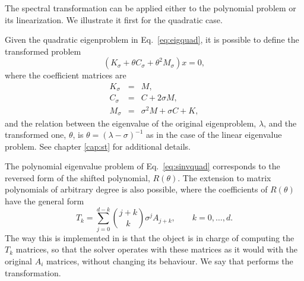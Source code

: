 The spectral transformation can be applied either to the polynomial problem or its linearization. We illustrate it first for the quadratic case.

Given the quadratic eigenproblem in Eq.\ \ref{eq:eigquad}, it is possible to define the transformed problem
\begin{equation}
\label{eq:sinvquad}
(K_\sigma+\theta C_\sigma+\theta^2M_\sigma)x=0,
\end{equation}
where the coefficient matrices are
\begin{eqnarray}
K_\sigma&\!\!=\!\!&M,\\
C_\sigma&\!\!=\!\!&C+2\sigma M,\\
M_\sigma&\!\!=\!\!&\sigma^2 M+\sigma C+K,
\end{eqnarray}
and the relation between the eigenvalue of the original eigenproblem, $\lambda$, and the transformed one, $\theta$, is $\theta=(\lambda-\sigma)^{-1}$ as in the case of the linear eigenvalue problem. See chapter \ref{cap:st} for additional details.

The polynomial eigenvalue problem of Eq.\ \ref{eq:sinvquad} corresponds to the reversed form of the shifted polynomial, $R(\theta)$. The extension to matrix polynomials of arbitrary degree is also possible, where the coefficients of $R(\theta)$ have the general form
\begin{equation}
\label{eq:sinvpep}
T_k=\sum_{j=0}^{d-k}\binom{j+k}{k}\sigma^{j}A_{j+k},\qquad k=0,\ldots,d.
\end{equation}
The way this is implemented in \slepc is that the  object is in charge of computing the $T_k$ matrices, so that the  solver operates with these matrices as it would with the original $A_i$ matrices, without changing its behaviour. We say that  performs the transformation.

